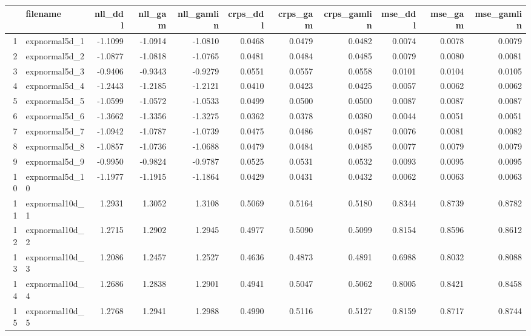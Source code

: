 \begin{table}[ht]
\centering
\begin{tabular}{rlrrrrrrrrr}
  \hline
 & filename & nll\_ddl & nll\_gam & nll\_gamlin & crps\_ddl & crps\_gam & crps\_gamlin & mse\_ddl & mse\_gam & mse\_gamlin \\ 
  \hline
1 & expnormal5d\_1 & -1.1099 & -1.0914 & -1.0810 & 0.0468 & 0.0479 & 0.0482 & 0.0074 & 0.0078 & 0.0079 \\ 
  2 & expnormal5d\_2 & -1.0877 & -1.0818 & -1.0765 & 0.0481 & 0.0484 & 0.0485 & 0.0079 & 0.0080 & 0.0081 \\ 
  3 & expnormal5d\_3 & -0.9406 & -0.9343 & -0.9279 & 0.0551 & 0.0557 & 0.0558 & 0.0101 & 0.0104 & 0.0105 \\ 
  4 & expnormal5d\_4 & -1.2443 & -1.2185 & -1.2121 & 0.0410 & 0.0423 & 0.0425 & 0.0057 & 0.0062 & 0.0062 \\ 
  5 & expnormal5d\_5 & -1.0599 & -1.0572 & -1.0533 & 0.0499 & 0.0500 & 0.0500 & 0.0087 & 0.0087 & 0.0087 \\ 
  6 & expnormal5d\_6 & -1.3662 & -1.3356 & -1.3275 & 0.0362 & 0.0378 & 0.0380 & 0.0044 & 0.0051 & 0.0051 \\ 
  7 & expnormal5d\_7 & -1.0942 & -1.0787 & -1.0739 & 0.0475 & 0.0486 & 0.0487 & 0.0076 & 0.0081 & 0.0082 \\ 
  8 & expnormal5d\_8 & -1.0857 & -1.0736 & -1.0688 & 0.0479 & 0.0484 & 0.0485 & 0.0077 & 0.0079 & 0.0079 \\ 
  9 & expnormal5d\_9 & -0.9950 & -0.9824 & -0.9787 & 0.0525 & 0.0531 & 0.0532 & 0.0093 & 0.0095 & 0.0095 \\ 
  10 & expnormal5d\_10 & -1.1977 & -1.1915 & -1.1864 & 0.0429 & 0.0431 & 0.0432 & 0.0062 & 0.0063 & 0.0063 \\ 
  11 & expnormal10d\_1 & 1.2931 & 1.3052 & 1.3108 & 0.5069 & 0.5164 & 0.5180 & 0.8344 & 0.8739 & 0.8782 \\ 
  12 & expnormal10d\_2 & 1.2715 & 1.2902 & 1.2945 & 0.4977 & 0.5090 & 0.5099 & 0.8154 & 0.8596 & 0.8612 \\ 
  13 & expnormal10d\_3 & 1.2086 & 1.2457 & 1.2527 & 0.4636 & 0.4873 & 0.4891 & 0.6988 & 0.8032 & 0.8088 \\ 
  14 & expnormal10d\_4 & 1.2686 & 1.2838 & 1.2901 & 0.4941 & 0.5047 & 0.5062 & 0.8005 & 0.8421 & 0.8458 \\ 
  15 & expnormal10d\_5 & 1.2768 & 1.2941 & 1.2988 & 0.4990 & 0.5116 & 0.5127 & 0.8159 & 0.8717 & 0.8744 \\ 

\end{tabular}
\end{table}
